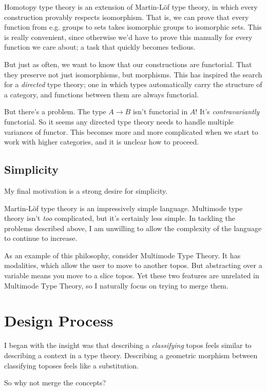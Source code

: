 \documentclass{article}
\begin{document}
Homotopy type theory is an extension of Martin-L\"of type theory,
in which every construction provably respects isomorphism.
That is, we can prove that every function from e.g. groups to sets
takes isomorphic groups to isomorphic sets. This is really convenient,
since otherwise we'd have to prove this manually for every function we care about;
a task that quickly becomes tedious.

But just as often, we want to know that our constructions are functorial.
That they preserve not just isomorphisms, but morphisms.
This has inspired the search for a \emph{directed} type theory;
one in which types automatically carry the structure of a category,
and functions between them are always functorial.

But there's a problem. The type \(A \to B\) isn't functorial in \(A\)!
It's \emph{contravariantly} functorial. So it seems any directed type theory
needs to handle multiple variances of functor.
This becomes more and more complicated when we start to work with higher categories,
and it is unclear how to proceed.

\subsection{Simplicity}

My final motivation is a strong desire for simplicity.

Martin-L\"of type theory is an impressively simple language.
Multimode type theory isn't \emph{too} complicated, but it's certainly less simple.
In tackling the problems described above, I am unwilling to allow
the complexity of the language to continue to increase.

As an example of this philosophy, consider Multimode Type Theory.
It has modalities, which allow the user to move to another topos.
But abstracting over a variable means you move to a slice topos.
Yet these two features are unrelated in Multimode Type Theory,
so I naturally focus on trying to merge them.

\section{Design Process}

I began with the insight was that describing a \emph{classifying} topos feels similar to describing a context in a type theory.
Describing a geometric morphism between classifying toposes feels like a substitution.

So why not merge the concepts?
\end{document}
